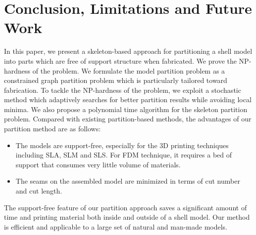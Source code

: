 \section{Conclusion, Limitations and Future Work}

In this paper, we present a skeleton-based approach for partitioning a shell model into parts which are free of support structure when fabricated. We prove the NP-hardness of the problem. We formulate the model partition problem as a constrained graph partition problem which is particularly tailored toward fabrication. To tackle the NP-hardness of the problem, we exploit a stochastic method which adaptively searches for better partition results while avoiding local minima. We also propose a polynomial time algorithm for the skeleton partition problem. Compared with existing partition-based methods, the advantages of our partition method are as follows:

\begin{itemize}
 \item The models are support-free, especially for the 3D printing techniques including SLA, SLM and SLS. For FDM technique, it requires a bed of support that consumes very little volume of materials.
\item The seams on the assembled model are minimized in terms of cut number and cut length.
\end{itemize}

The support-free feature of our partition approach saves a significant amount of time and printing material both inside and outside of a shell model. Our method is efficient and applicable to a large set of natural and man-made models.

